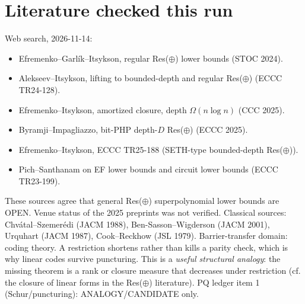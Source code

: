 \documentclass[11pt]{article}
\begin{document}
\section{Literature checked this run}
Web search, 2026-11-14:
\begin{itemize}
\item Efremenko--Garl\'ik--Itsykson, regular Res($\oplus$) lower bounds (STOC 2024).
\item Alekseev--Itsykson, lifting to bounded-depth and regular Res($\oplus$) (ECCC TR24-128).
\item Efremenko--Itsykson, amortized closure, depth $\Omega(n\log n)$ (CCC 2025).
\item Byramji--Impagliazzo, bit-PHP depth-$D$ Res($\oplus$) (ECCC 2025).
\item Efremenko--Itsykson, ECCC TR25-188 (SETH-type bounded-depth Res($\oplus$)).
\item Pich--Santhanam on EF lower bounds and circuit lower bounds (ECCC TR23-199).
\end{itemize}
These sources agree that general Res($\oplus$) superpolynomial lower bounds are OPEN. Venue status of the 2025 preprints was not verified. Classical sources: Chv\'atal--Szemer\'edi (JACM 1988), Ben-Sasson--Wigderson (JACM 2001), Urquhart (JACM 1987), Cook--Reckhow (JSL 1979). Barrier-transfer domain: coding theory. A restriction shortens rather than kills a parity check, which is why linear codes survive puncturing. This is a \emph{useful structural analogy}: the missing theorem is a rank or closure measure that decreases under restriction (cf. the closure of linear forms in the Res($\oplus$) literature). PQ ledger item 1 (Schur/puncturing): ANALOGY/CANDIDATE only.
\end{document}
